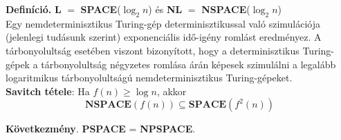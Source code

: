 \documentclass[tikz,12pt,margin=0px]{article}
\begin{document}
	\noindent \textbf{Definíció.} \textbf{L} $=$ \textbf{SPACE}($\log_{2} n$) és \textbf{NL} $=$ \textbf{NSPACE}($\log_{2} n$) \\

    \noindent Egy nemdeterminisztikus Turing-gép determinisztikussal való szimulációja (jelenlegi tudásunk szerint) exponenciális idő-igény romlást eredményez. A tárbonyolultság esetében viszont bizonyított, hogy a determinisztikus Turing-gépek a tárbonyolultság négyzetes romlása árán képesek szimulálni a legalább logaritmikus tárbonyolultságú nemdeterminisztikus Turing-gépeket.\\
	
	\noindent \textbf{Savitch tétele}: Ha $f(n) \geq \log n$, akkor
    \[
        \textbf{NSPACE}(f(n)) \subseteq \textbf{SPACE}(f^{2}(n))
    \]

    \noindent \textbf{Következmény}. \textbf{PSPACE} = \textbf{NPSPACE}.
\end{document}
